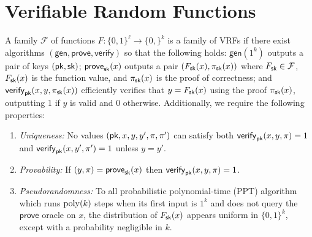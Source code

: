 \section{Verifiable Random Functions}
\newcommand{\Gen}{\mathsf{gen}}
\newcommand{\Prove}{\mathsf{prove}}
\newcommand{\Verify}{\mathsf{verify}}
\begin{definition}\label{def:VRF}
  A family $\mathcal{F}$ 
  of functions $F : \{0,1\}^\ell \rightarrow \{0,\}^k$ 
  is a family of VRFs if there exist algorithms 
  $(\Gen, \Prove, \Verify)$ 
  so that the following holds: 
  $\Gen(1^k)$ outputs a pair of keys $(\mathsf{pk}, \mathsf{sk})$; 
  $\Prove_\sk(x)$ outputs a pair $(F_{\mathsf{sk}}(x), \pi_{\mathsf{sk}}(x))$ 
  where 
  $F_{\mathsf{sk}} \in \mathcal{F}$, $F_{\mathsf{sk}}(x)$ is the function value, and 
  $\pi_{\mathsf{sk}}(x)$ is the proof of correctness; and 
  $\Verify_\pk(x,y,\pi_\sk(x))$ efficiently verifies 
  that $y = F_{\mathsf{sk}}(x)$ using the proof $\pi_{\mathsf{sk}}(x)$, 
  outputting 1 if $y$ is valid and 0 otherwise. 
  Additionally, we require the following properties:

  \begin{enumerate}
    \item \emph{Uniqueness:} 
    No values $(\mathsf{pk}, x, y, y', \pi, \pi')$  can satisfy both 
    $\Verify_\pk(x,y,\pi) = 1$ and $\Verify_\pk(x,y',\pi') = 1$ 
    unless $y = y'$.

    \item \emph{Provability:} 
    If $(y, \pi) = \Prove_\sk(x)$ then $\Verify_\pk(x,y, \pi) = 1$.

    \item \emph{Pseudorandomness:} 
    To all probabilistic polynomial-time (PPT) algorithm 
    which runs $\mathrm{poly}(k)$ steps when its first input is $1^k$ 
    and does not query the $\Prove$ oracle on $x$, 
    the distribution of $F_{\mathsf{sk}}(x)$ appears uniform in $\{0,1\}^k$, 
    except with a probability negligible in $k$.
  \end{enumerate}

\end{definition}
